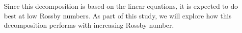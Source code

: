 \documentclass[../Rajarshi-thesis-draft.tex]{subfiles}
\begin{document}
Since this decomposition is based on the linear equations, it is expected to do best at low Rossby numbers.  As part of this study, we will explore how this decomposition performs with increasing   Rossby number. 




\end{document}
